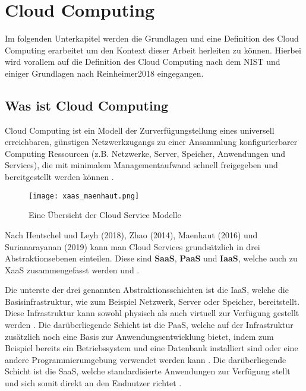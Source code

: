 \section{Cloud Computing}

Im folgenden Unterkapitel werden die Grundlagen und eine Definition des Cloud Computing erarbeitet um den Kontext dieser Arbeit herleiten zu können.
Hierbei wird vorallem auf die Definition des Cloud Computing nach dem \ac{NIST} und einiger Grundlagen nach Reinheimer2018 eingegangen.

\subsection{Was ist Cloud Computing}

Cloud Computing ist ein Modell der Zurverfügungstellung eines universell erreichbaren,
günstigen Netzwerkzugangs zu einer Ansammlung konfigurierbarer Computing Ressourcen
(z.B. Netzwerke, Server, Speicher, Anwendungen und Services), die mit minimalem Managementaufwand schnell freigegeben und bereitgestellt werden können
\cite[Vgl.][S. 2]{Mell2011}.

\begin{wrapfigure}{r}{0.45\textwidth}
\centering
\texttt{[image: xaas\_maenhaut.png]}
\caption{Eine Übersicht der Cloud Service Modelle \cite[S. 33]{Maenhaut2016}}
\label{fig:XaaS}
\end{wrapfigure}

Nach Hentschel und Leyh (2018), Zhao (2014), Maenhaut (2016) und Surianarayanan (2019) kann man Cloud Services grundsätzlich in drei Abstraktionsebenen einteilen. Diese sind \textbf{\ac{SaaS}},
\textbf{\ac{PaaS}} und \textbf{\ac{IaaS}}, welche auch zu \ac{XaaS} zusammengefasst werden
\cite[Vgl.][S. 9]{Reinheimer2018}\cite[Vgl.][S. 143f]{Zhao2014}\cite[Vgl.][S. 32ff]{Maenhaut2016} und \cite[Vgl.][S. 226ff]{Surianarayanan2019}.

Die unterste der drei genannten Abstraktionsschichten ist die \ac{IaaS}, welche die Basisinfrastruktur, wie zum Beispiel Netzwerk, Server oder Speicher,
bereitstellt. Diese Infrastruktur kann sowohl physisch als auch virtuell zur Verfügung gestellt werden \cite[Vgl.][S. 9f]{Reinheimer2018}.
Die darüberliegende Schicht ist die \ac{PaaS}, welche auf der Infrastruktur zusätzlich noch eine Basis zur Anwendungsentwicklung bietet, indem zum Beispiel
bereits ein Betriebssystem und eine Datenbank installiert sind oder eine andere Programmierumgebung verwendet werden kann \cite[Vgl.][S. 10]{Reinheimer2018}.
Die darüberliegende Schicht ist die \ac{SaaS}, welche standardisierte Anwendungen zur Verfügung stellt und sich somit direkt an den Endnutzer richtet
\cite[Vgl.][S. 11]{Reinheimer2018}.

